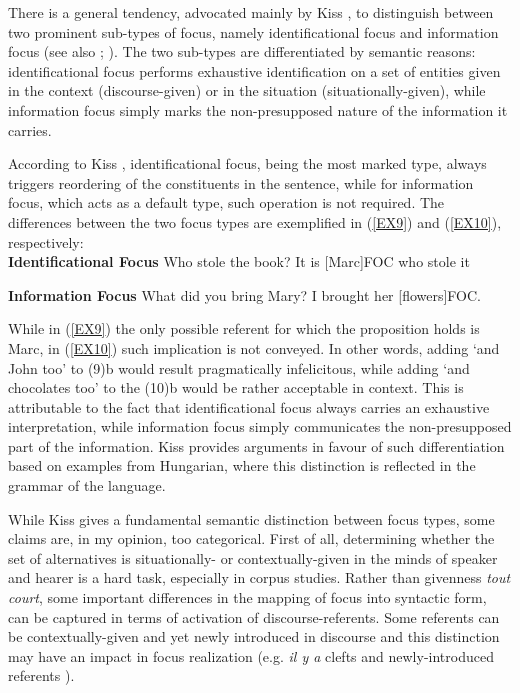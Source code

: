 \documentclass[12pt]{report}
\begin{document}
There is a general tendency, advocated mainly by Kiss \cite{kiss1998identificational}, to distinguish between two prominent sub-types of focus, namely identificational focus and information focus (see also \cite{rochemont1986focus}; \cite{campos1990focalization}). The two sub-types are  differentiated by semantic reasons: identificational focus performs exhaustive identification on a set of entities given in the context (discourse-given) or in the situation (situationally-given), while information focus simply marks the non-presupposed nature of the information it carries. 

According to Kiss \cite{kiss1998identificational}, identificational focus, being the most marked type, always triggers reordering of the constituents in the sentence, while for information focus, which acts as a default type, such operation is not required. The differences between the two focus types are exemplified in (\ref{EX9}) and (\ref{EX10}), respectively:\\
 
 
\noindent
\textbf{Identificational Focus}
\pex \label{EX9}
\a Who stole the book?
\vspace{-0.3cm}
\a It is [Marc]\tiny{FOC} \normalsize who stole it\\
\xe 


\noindent
\textbf{Information Focus}
\pex \label{EX10}
\a What did you bring Mary?
\vspace{0.1cm}
\a I brought her [flowers]\tiny FOC.
\xe

\noindent 
While in (\ref{EX9}) the only possible referent for which the proposition holds is Marc, in (\ref{EX10}) such implication is not conveyed. In other words, adding ‘and John too' to (9)b would result pragmatically infelicitous, while adding ‘and chocolates too' to the (10)b would be rather acceptable in context. This is attributable to the fact that identificational focus always carries an exhaustive interpretation, while information focus simply communicates the non-presupposed part of the information. 
Kiss \cite{kiss1998identificational} provides arguments in favour of such differentiation based on examples from Hungarian, where this distinction is reflected in the grammar of the language. 


While Kiss gives a fundamental semantic distinction between focus types, some claims are, in my opinion, too categorical. First of all, determining whether the set of alternatives is situationally- or contextually-given in the minds of speaker and hearer is a hard task, especially in corpus studies. Rather than givenness \textit{tout court}, some important differences in the mapping of focus into syntactic form, can be captured in terms of activation of discourse-referents. Some referents can be contextually-given and yet newly introduced in discourse and this distinction may have an impact in focus realization (e.g. \textit{il y a} clefts and newly-introduced referents \cite{lambrecht2000subjects}).
\end{document}
